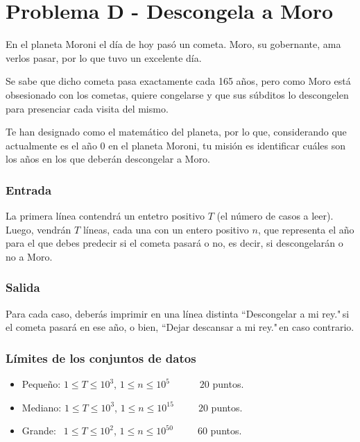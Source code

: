 \chapter*{Problema D - Descongela a Moro}

En el planeta Moroni el día de hoy pasó un cometa. Moro,
su gobernante, ama verlos pasar, por lo que tuvo un 
excelente día. 

Se sabe que dicho cometa pasa exactamente cada 165 años, 
pero como Moro está obsesionado con los cometas, quiere
congelarse y que sus súbditos lo descongelen para 
presenciar cada visita del mismo.

Te han designado como el matemático del planeta, por lo
que, considerando que actualmente es el año 0 en el 
planeta Moroni, tu misión es identificar cuáles son los
años en los que deberán descongelar a Moro.



\subsection*{Entrada}
La primera línea contendrá un entetro positivo $T$ (el 
número de casos a leer). Luego, vendrán $T$ líneas, cada
una con un entero positivo $n$, que representa el año para
el que debes predecir si el cometa pasará o no, es decir,
si descongelarán o no a Moro.



\subsection*{Salida}
Para cada caso, deberás imprimir en una línea distinta
``Descongelar a mi rey."$\,$si el cometa pasará en ese 
año, o bien, ``Dejar descansar a mi rey."$\,$en caso
contrario.



\subsection*{Límites de los conjuntos de datos}

\begin{itemize}
    \item Pequeño: $ 1 \leq T \leq 10^3 $, $ 1 \leq n
    \leq 10^5$   $\quad \;\;\;\;\;$ $20$ puntos.
    \item Mediano: $ 1 \leq T \leq 10^3 $, $ 1 \leq n
    \leq 10^{15}$   $\quad \;\;\;$ $20$ puntos.
    \item Grande: $ \;\, 1 \leq T \leq 10^{2}$, $ 1 
    \leq n \leq 10^{50} $ $\quad \;\;\;$ $60$ puntos.
\end{itemize}



